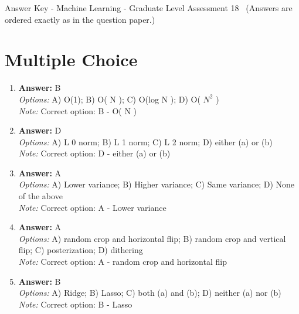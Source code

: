 \documentclass[12pt]{article}
\begin{document}
\begin{center}
Answer Key - Machine Learning - Graduate Level Assessment 18 \
\small (Answers are ordered exactly as in the question paper.)
\end{center}

\section*{Multiple Choice}
\begin{enumerate}[label=\arabic*.]
\item \textbf{Answer:} B
\\ \textit{Options:} A) O(1); B) O( N ); C) O(log N ); D) O( $N^2$ )
\\ \textit{Note:} Correct option: B - O( N )
\item \textbf{Answer:} D
\\ \textit{Options:} A) L 0 norm; B) L 1 norm; C) L 2 norm; D) either (a) or (b)
\\ \textit{Note:} Correct option: D - either (a) or (b)
\item \textbf{Answer:} A
\\ \textit{Options:} A) Lower variance; B) Higher variance; C) Same variance; D) None of the above
\\ \textit{Note:} Correct option: A - Lower variance
\item \textbf{Answer:} A
\\ \textit{Options:} A) random crop and horizontal flip; B) random crop and vertical flip; C) posterization; D) dithering
\\ \textit{Note:} Correct option: A - random crop and horizontal flip
\item \textbf{Answer:} B
\\ \textit{Options:} A) Ridge; B) Lasso; C) both (a) and (b); D) neither (a) nor (b)
\\ \textit{Note:} Correct option: B - Lasso
\end{enumerate}
\end{document}
